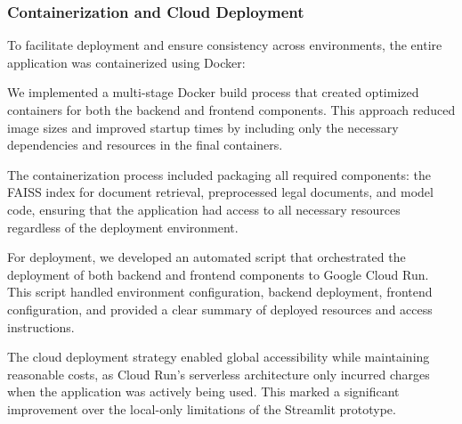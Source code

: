 \subsubsection{Containerization and Cloud Deployment}

To facilitate deployment and ensure consistency across environments, the entire application was containerized using Docker:

We implemented a multi-stage Docker build process that created optimized containers for both the backend and frontend components. This approach reduced image sizes and improved startup times by including only the necessary dependencies and resources in the final containers.

The containerization process included packaging all required components: the FAISS index for document retrieval, preprocessed legal documents, and model code, ensuring that the application had access to all necessary resources regardless of the deployment environment.

For deployment, we developed an automated script that orchestrated the deployment of both backend and frontend components to Google Cloud Run. This script handled environment configuration, backend deployment, frontend configuration, and provided a clear summary of deployed resources and access instructions.

The cloud deployment strategy enabled global accessibility while maintaining reasonable costs, as Cloud Run's serverless architecture only incurred charges when the application was actively being used. This marked a significant improvement over the local-only limitations of the Streamlit prototype.
